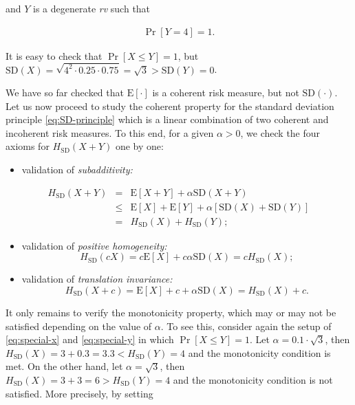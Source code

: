 \documentclass[]{book}
\providecommand{\tightlist}{%
  \setlength{\itemsep}{0pt}\setlength{\parskip}{0pt}}
\theoremstyle{definition}
\theoremstyle{definition}
\theoremstyle{definition}
\theoremstyle{remark}
\begin{document}
and \(Y\) is a degenerate \emph{rv} such that

\begin{eqnarray}
\Pr[Y = 4] = 1.
\label{eq:special-y}
\end{eqnarray}

It is easy to check that \(\Pr[X\leq Y]=1\), but
\(\mathrm{SD}(X)=\sqrt{4^2\cdot 0.25\cdot 0.75}=\sqrt{3}>\mathrm{SD}(Y)=0\).

We have so far checked that \(\mathrm{E}[\cdot]\) is a coherent risk
measure, but not \(\mathrm{SD}(\cdot)\). Let us now proceed to study the
coherent property for the standard deviation principle
\eqref{eq:SD-principle} which is a linear combination of two coherent and
incoherent risk measures. To this end, for a given \(\alpha>0\), we
check the four axioms for \(H_{\mathrm{SD}}(X+Y)\) one by one:

\begin{itemize}
\tightlist
\item
  validation of \emph{subadditivity:}
\end{itemize}

\begin{eqnarray*}
  H_{\mathrm{SD}}(X+Y) &=& \mathrm{E}[X+Y]+\alpha \mathrm{SD}(X+Y) \\
  &\leq& \mathrm{E}[X]+\mathrm{E}[Y]+\alpha [\mathrm{SD}(X) +\mathrm{SD}(Y)]\\
  &=& H_{\mathrm{SD}}(X)+ H_{\mathrm{SD}}(Y);
\end{eqnarray*}

\begin{itemize}
\tightlist
\item
  validation of \emph{positive homogeneity:} \[
  H_{\mathrm{SD}}(cX)=c\mathrm{E}[X]+c\alpha\mathrm{SD}(X)=cH_{\mathrm{SD}}(X);
  \]
\item
  validation of \emph{translation invariance:} \[
  H_{\mathrm{SD}}(X+c)=\mathrm{E}[X]+c+\alpha\mathrm{SD}(X)=H_{\mathrm{SD}}(X)+c.
  \]
\end{itemize}

It only remains to verify the monotonicity property, which may or may
not be satisfied depending on the value of \(\alpha\). To see this,
consider again the setup of \eqref{eq:special-x} and \eqref{eq:special-y} in
which \(\Pr[X\leq Y]=1\). Let \(\alpha=0.1\cdot \sqrt{3}\), then
\(H_{\mathrm{SD}}(X)=3+0.3=3.3< H_{\mathrm{SD}}(Y)=4\) and the
monotonicity condition is met. On the other hand, let
\(\alpha=\sqrt{3}\), then
\(H_{\mathrm{SD}}(X)=3+3=6> H_{\mathrm{SD}}(Y)=4\) and the monotonicity
condition is not satisfied. More precisely, by setting
\end{document}
